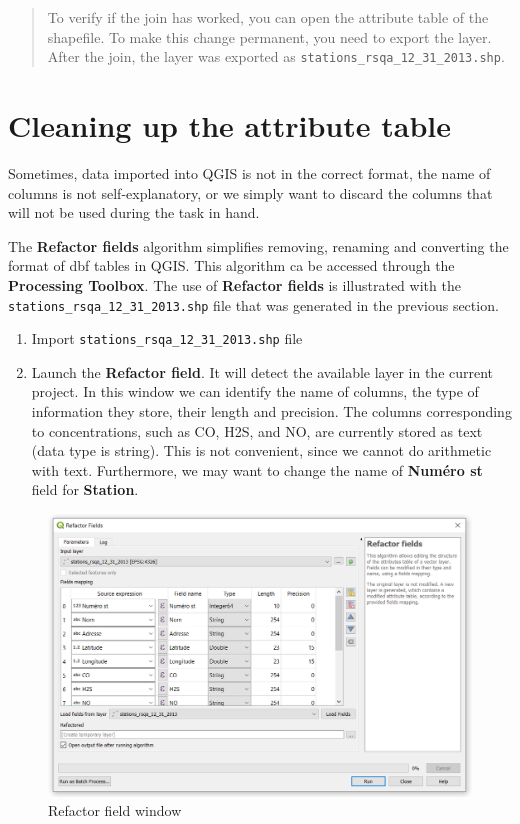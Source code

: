 \documentclass[]{book}
\providecommand{\tightlist}{%
  \setlength{\itemsep}{0pt}\setlength{\parskip}{0pt}}
\theoremstyle{definition}
\theoremstyle{definition}
\theoremstyle{definition}
\theoremstyle{remark}
\begin{document}
\begin{quote}
To verify if the join has worked, you can open the attribute table of
the shapefile. To make this change permanent, you need to export the
layer. After the join, the layer was exported as
\texttt{stations\_rsqa\_12\_31\_2013.shp}.
\end{quote}

\section{Cleaning up the attribute
table}\label{cleaning-up-the-attribute-table}

Sometimes, data imported into QGIS is not in the correct format, the
name of columns is not self-explanatory, or we simply want to discard
the columns that will not be used during the task in hand.

The \textbf{Refactor fields} algorithm simplifies removing, renaming and
converting the format of dbf tables in QGIS. This algorithm ca be
accessed through the \textbf{Processing Toolbox}. The use of
\textbf{Refactor fields} is illustrated with the
\texttt{stations\_rsqa\_12\_31\_2013.shp} file that was generated in the
previous section.

\begin{enumerate}
\def\labelenumi{\arabic{enumi}.}
\tightlist
\item
  Import \texttt{stations\_rsqa\_12\_31\_2013.shp} file
\item
  Launch the \textbf{Refactor field}. It will detect the available layer
  in the current project. In this window we can identify the name of
  columns, the type of information they store, their length and
  precision. The columns corresponding to concentrations, such as CO,
  H2S, and NO, are currently stored as text (data type is string). This
  is not convenient, since we cannot do arithmetic with text.
  Furthermore, we may want to change the name of \textbf{Numéro st}
  field for \textbf{Station}.
\end{enumerate}

\begin{figure}

{\centering \includegraphics[width=15.72in]{figures/Refactor_Dialog} 

}

\caption{Refactor field window}\label{fig:unnamed-chunk-16}
\end{figure}
\end{document}
